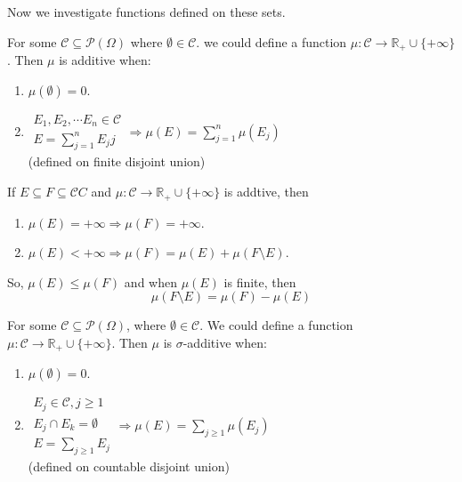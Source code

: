 Now we investigate functions defined on these sets.
\begin{define}
  For some $\mathcal{C}\subseteq\mathcal{P}(\Omega)$ where $\emptyset\in\mathcal{C}$. we could define a function $\mu:\mathcal{C}\to\mathbb{R}_+\cup\{+\infty\}$.
  Then $\mu$ is additive when:
  \begin{enumerate}
  \item $\mu(\emptyset) = 0$.
  \item $\substack{E_1, E_2, \cdots E_n\in\mathcal{C}\\E = \sum_{j=1}^n E_jj} \Rightarrow \mu(E) = \sum_{j = 1}^n \mu(E_j)$ \\
    (defined on finite disjoint union) \\
  \end{enumerate}
\end{define}

\begin{observation}
  If $E\subseteq F\subseteq \mathcal{C}C$ and $\mu:\mathcal{C} \to \mathbb{R}_+\cup \{+\infty\}$ is addtive, then
  \begin{enumerate}
  \item $\mu(E) = +\infty \Rightarrow \mu(F) = +\infty$.
  \item $\mu(E) < +\infty \Rightarrow \mu(F) = \mu(E) + \mu(F\setminus E)$.
  \end{enumerate}
  So, $\mu(E)\leq \mu(F)$ and when $\mu(E)$ is finite, then
  \[\mu(F\setminus E) = \mu(F) - \mu(E)\]
\end{observation}

\begin{define}
  For some $\mathcal{C}\subseteq\mathcal{P}(\Omega)$, where $\emptyset\in\mathcal{C}$. We could define a function $\mu:\mathcal{C}\to\mathbb{R}_+\cup\{+\infty\}$.
  Then $\mu$ is $\sigma$-additive when:
  \begin{enumerate}
  \item $\mu(\emptyset) = 0$.
  \item $\substack{E_j\in\mathcal{C}, j\geq 1\\E_j \cap E_k = \emptyset \\ E = \sum_{j\geq 1} E_j} \Rightarrow \mu(E) = \sum_{j\geq 1}\mu(E_j)$ \\
    (defined on countable disjoint union)
  \end{enumerate}
\end{define}

